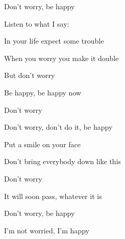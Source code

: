 Don't worry, be happy 

Listen to what I say: 

In your life expect some trouble 

When you worry you make it double 

But don't worry

Be happy, be happy now
\ks

\zr
\kr

\zs
Don't worry 

Don't worry, don't do it, be happy 

Put a smile on your face 

Don't bring everybody down like this 
\ks

\zr
Don't worry

It will soon pass, whatever it is 

Don't worry, be happy 

I'm not worried, I'm happy
\kr

\kp
